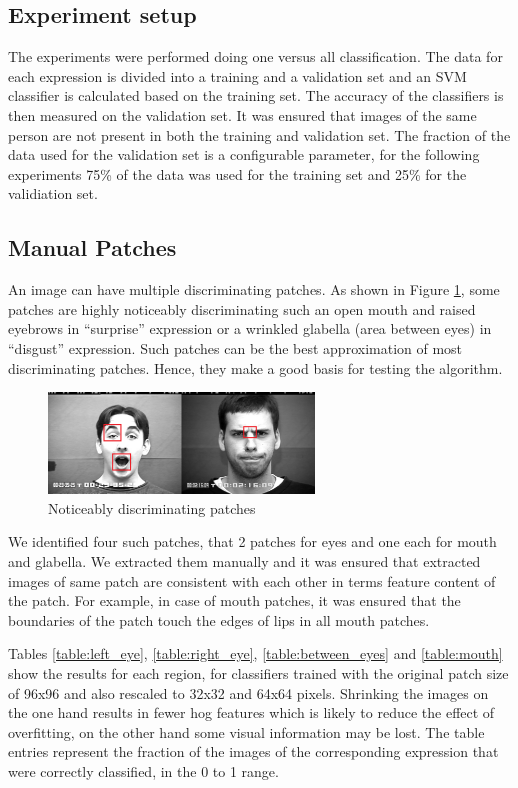 \subsection{Experiment setup}
The experiments were performed doing one versus all classification. The data for each expression is divided into a training and a validation set and an SVM
classifier is calculated based on the training set. The accuracy of the classifiers is then measured on the validation set. It was ensured that images of the same
person are not present in both the training and validation set. The fraction of the data used for the validation set is a configurable parameter, for the 
following experiments 75\% of the data was used for the training set and 25\% for the validiation set. 

\subsection{Manual Patches}

An image can have multiple discriminating patches. As shown in Figure \ref{fig:manual_patch}, some patches are highly noticeably discriminating such an open mouth and raised eyebrows in "`surprise"' expression or a wrinkled glabella (area between eyes) in "`disgust"' expression. Such patches can be the best approximation of most discriminating patches. Hence, they make a good basis for testing the algorithm. 

\begin{figure}
\centering
\includegraphics[width=200pt]{img/manual_patch.png}
  \caption{Noticeably discriminating patches}
  \label{fig:manual_patch}
\end{figure}

We identified four such patches, that 2 patches for eyes and one each for mouth and glabella. We extracted them manually and it was ensured that extracted images of same patch are consistent with each other in terms feature content of the patch. For example, in case of mouth patches, it was ensured that the boundaries of the patch touch the edges of lips in all mouth patches.

Tables \ref{table:left_eye}, \ref{table:right_eye}, \ref{table:between_eyes} and \ref{table:mouth} show the results for each region, for classifiers trained 
with the original patch size of 96x96 and also rescaled to 32x32 and 64x64 pixels. Shrinking the images on the one hand results in fewer hog features which is likely to reduce the effect of overfitting, on the other hand some visual information may be lost. The table entries represent the fraction of the images of the corresponding expression that were correctly classified, in the 0 to 1 range.




